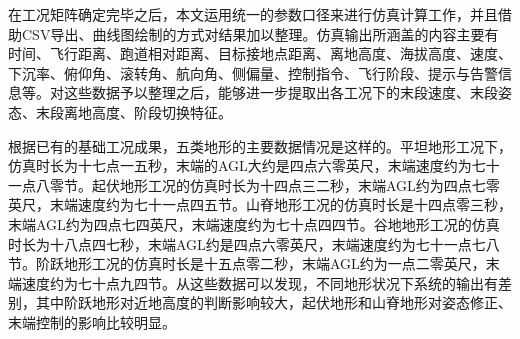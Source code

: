 在工况矩阵确定完毕之后，本文运用统一的参数口径来进行仿真计算工作，并且借助CSV导出、曲线图绘制的方式对结果加以整理。仿真输出所涵盖的内容主要有时间、飞行距离、跑道相对距离、目标接地点距离、离地高度、海拔高度、速度、下沉率、俯仰角、滚转角、航向角、侧偏量、控制指令、飞行阶段、提示与告警信息等。对这些数据予以整理之后，能够进一步提取出各工况下的末段速度、末段姿态、末段离地高度、阶段切换特征。

根据已有的基础工况成果，五类地形的主要数据情况是这样的。平坦地形工况下，仿真时长为十七点一五秒，末端的AGL大约是四点六零英尺，末端速度约为七十一点八零节。起伏地形工况的仿真时长为十四点三二秒，末端AGL约为四点七零英尺，末端速度约为七十一点四五节。山脊地形工况的仿真时长是十四点零三秒，末端AGL约为四点七四英尺，末端速度约为七十点四四节。谷地地形工况的仿真时长为十八点四七秒，末端AGL约是四点六零英尺，末端速度约为七十一点七八节。阶跃地形工况的仿真时长是十五点零二秒，末端AGL约为一点二零英尺，末端速度约为七十点九四节。从这些数据可以发现，不同地形状况下系统的输出有差别，其中阶跃地形对近地高度的判断影响较大，起伏地形和山脊地形对姿态修正、末端控制的影响比较明显。

